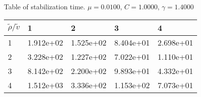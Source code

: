 \begin{center}
	Table of stabilization time. $\mu = 0.0100$, $C = 1.0000$, $\gamma = 1.4000$
	
	\begin{tabular}{|p{0.8in}|p{0.8in}|p{0.8in}|p{0.8in}|p{0.8in}|} \hline
		$\tilde{\rho} / \tilde{v}$ &1 &2 &3 &4 \\ \hline 
		1 &1.912e+02 &1.525e+02 &8.404e+01 &2.698e+01 \\ \hline 
		2 &3.228e+02 &1.227e+02 &7.022e+01 &1.110e+01 \\ \hline 
		3 &8.142e+02 &2.200e+02 &9.893e+01 &4.332e+01 \\ \hline 
		4 &1.512e+03 &3.336e+02 &1.153e+02 &7.073e+01 \\ \hline 
		
	\end{tabular}\\[20pt]
\end{center}
